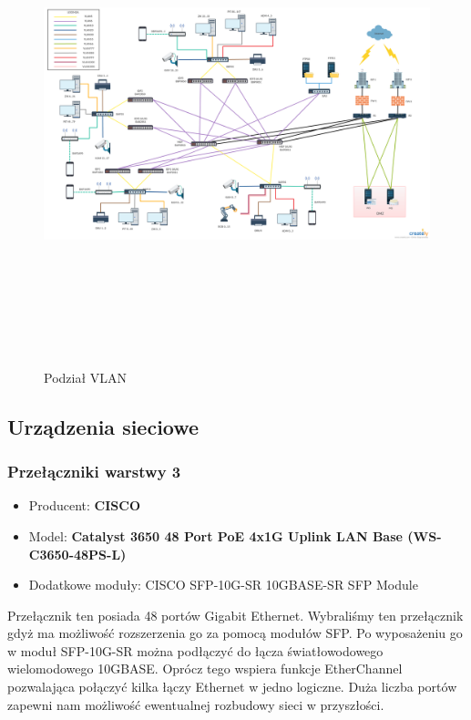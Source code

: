 \documentclass[12pt,a4paper,titlepage]{article}
\begin{document}
\newpage
\begin{figure}[H]
  \centering
    \includegraphics[height=14cm, angle=90]{images/Logical_diagram_VLAN.png}
    \caption{Podział VLAN}
    \label{fig:VLAN}
\end{figure}

\subsection{Urządzenia sieciowe}

\subsubsection{Przełączniki warstwy 3}
\begin{itemize}
    \item Producent: \textbf{CISCO}
    \item Model: \textbf{Catalyst 3650 48 Port PoE 4x1G Uplink LAN Base (WS-C3650-48PS-L)}
    \item Dodatkowe moduły:  CISCO SFP-10G-SR 10GBASE-SR SFP Module
\end{itemize}

Przełącznik ten posiada 48 portów Gigabit Ethernet. Wybraliśmy ten przełącznik gdyż ma możliwość
rozszerzenia go za pomocą modułów SFP. Po wyposażeniu go w moduł SFP-10G-SR można podłączyć
do łącza światłowodowego wielomodowego 10GBASE. Oprócz tego wspiera funkcje EtherChannel pozwalająca połączyć kilka łączy Ethernet w jedno logiczne. Duża liczba portów zapewni nam możliwość ewentualnej rozbudowy sieci w przyszłości.
\end{document}
